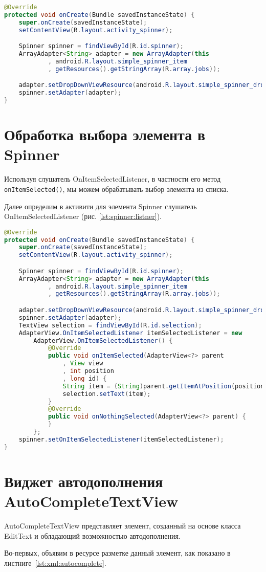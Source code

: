 \begin{lstlisting}[language=Java
	, label=lst:java:spinner
	]
@Override
protected void onCreate(Bundle savedInstanceState) {
	super.onCreate(savedInstanceState);
	setContentView(R.layout.activity_spinner);

	Spinner spinner = findViewById(R.id.spinner);
	ArrayAdapter<String> adapter = new ArrayAdapter(this
			, android.R.layout.simple_spinner_item
			, getResources().getStringArray(R.array.jobs));

	adapter.setDropDownViewResource(android.R.layout.simple_spinner_dropdown_item);
	spinner.setAdapter(adapter);
}
\end{lstlisting}

\section{Обработка выбора элемента в Spinner}
Используя слушатель OnItemSelectedListener, в частности его метод
\texttt{onItemSelected()}, мы можем обрабатывать выбор элемента из списка.\par
Далее определим в активити для элемента Spinner слушатель
OnItemSelectedListener (рис. \ref{lst:spinner:listner}).

\begin{lstlisting}[language=Java
	, label=lst:spinner:listner
	]
@Override
protected void onCreate(Bundle savedInstanceState) {
	super.onCreate(savedInstanceState);
	setContentView(R.layout.activity_spinner);

	Spinner spinner = findViewById(R.id.spinner);
	ArrayAdapter<String> adapter = new ArrayAdapter(this
			, android.R.layout.simple_spinner_item
			, getResources().getStringArray(R.array.jobs));

	adapter.setDropDownViewResource(android.R.layout.simple_spinner_dropdown_item);
	spinner.setAdapter(adapter);
	TextView selection = findViewById(R.id.selection);
	AdapterView.OnItemSelectedListener itemSelectedListener = new
		AdapterView.OnItemSelectedListener() {
			@Override
			public void onItemSelected(AdapterView<?> parent
				, View view
				, int position
				, long id) {
				String item = (String)parent.getItemAtPosition(position);
				selection.setText(item);
			}
			@Override
			public void onNothingSelected(AdapterView<?> parent) {
			}
		};
	spinner.setOnItemSelectedListener(itemSelectedListener);
}
\end{lstlisting}

\section{Виджет автодополнения AutoCompleteTextView}
AutoCompleteTextView представляет элемент, созданный на основе класса
EditText и обладающий возможностью автодополнения.\par
Во-первых, объявим в ресурсе разметке данный элемент, как показано
в листниге~\ref{lst:xml:autocomplete}.

